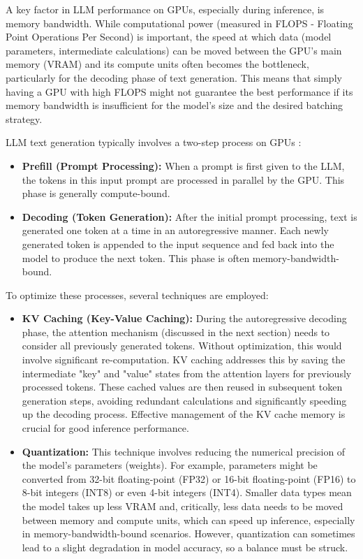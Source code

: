 A key factor in LLM performance on GPUs, especially during inference, is memory bandwidth. While computational power (measured in FLOPS - 
Floating Point Operations Per Second) is important, the speed at which data (model parameters, intermediate calculations) can be moved between 
the GPU's main memory (VRAM) and its compute units often becomes the bottleneck, particularly for the decoding phase of text generation. 
This means that simply having a GPU with high FLOPS might not guarantee the best performance if its memory bandwidth is insufficient for the 
model's size and the desired batching strategy.

LLM text generation typically involves a two-step process on GPUs :

\begin{itemize}
    \item \textbf{Prefill (Prompt Processing):} When a prompt is first given to the LLM, the tokens in this input prompt are processed in parallel 
    by the GPU. This phase is generally compute-bound.
    \item \textbf{Decoding (Token Generation):} After the initial prompt processing, text is generated one token at a time in an 
    autoregressive manner. Each newly generated token is appended to the input sequence and fed back into the model to produce the next token. 
    This phase is often memory-bandwidth-bound.
\end{itemize}

To optimize these processes, several techniques are employed:

\begin{itemize}
    \item \textbf{KV Caching (Key-Value Caching):} During the autoregressive decoding phase, the attention mechanism (discussed in the next section) 
    needs to consider all previously generated tokens. Without optimization, this would involve significant re-computation. 
    KV caching addresses this by saving the intermediate "key" and "value" states from the attention layers for previously processed tokens. 
    These cached values are then reused in subsequent token generation steps, avoiding redundant calculations and significantly speeding up the decoding process.
     Effective management of the KV cache memory is crucial for good inference performance.
    \item \textbf{Quantization:} This technique involves reducing the numerical precision of the model's parameters (weights). 
    For example, parameters might be converted from 32-bit floating-point (FP32) or 16-bit floating-point (FP16) to 8-bit integers (INT8) or even 
    4-bit integers (INT4). Smaller data types mean the model takes up less VRAM and, critically, less data needs to be moved between memory and compute units, 
    which can speed up inference, especially in memory-bandwidth-bound scenarios. However, quantization can sometimes lead to a slight degradation in model accuracy,
     so a balance must be struck.
\end{itemize}

